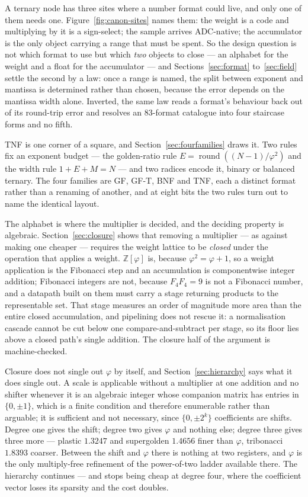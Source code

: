 \documentclass[11pt]{article}
\theoremstyle{definition}
\begin{document}
A ternary node has three sites where a number format could live, and only one of
them needs one. Figure~\ref{fig:canon-sites} names them: the weight is a code and
multiplying by it is a sign-select; the
sample arrives ADC-native; the accumulator is the only object carrying a range
that must be spent. So the design question is not which format to use but which
\emph{two} objects to close --- an alphabet for the weight and a float for the
accumulator --- and Sections~\ref{sec:format} to~\ref{sec:field} settle the
second by a law: once a range is named, the split between exponent and mantissa
is determined rather than chosen, because the error depends on the mantissa
width alone. Inverted, the same law reads a format's behaviour back out of its
round-trip error and resolves an 83-format catalogue into four staircase forms
and no fifth.

TNF is one corner of a square, and Section~\ref{sec:fourfamilies} draws it. Two
rules fix an exponent budget --- the golden-ratio rule
$E=\operatorname{round}((N-1)/\varphi^{2})$ and the width rule $1+E+M=N$ --- and
two radices encode it, binary or balanced ternary. The four families are GF,
GF-T, BNF and TNF, each a distinct format rather than a renaming of another, and
at eight bits the two rules turn out to name the identical layout.

The alphabet is where the multiplier is decided, and the deciding property is
algebraic. Section~\ref{sec:closure} shows that removing a multiplier --- as
against making one cheaper --- requires the weight lattice to be \emph{closed}
under the operation that applies a weight. $\mathbb{Z}[\varphi]$ is, because
$\varphi^2=\varphi+1$, so a weight application is the Fibonacci step and an
accumulation is componentwise integer addition; Fibonacci integers are not,
because $F_4F_4=9$ is not a Fibonacci number, and a datapath built on them must
carry a stage returning products to the representable set. That stage measures
an order of magnitude more area than the entire closed accumulation, and
pipelining does not rescue it: a normalisation cascade cannot be cut below one
compare-and-subtract per stage, so its floor lies above a closed path's single
addition. The closure half of the argument is machine-checked.

Closure does not single out $\varphi$ by itself, and Section~\ref{sec:hierarchy}
says what it does single out. A scale is applicable without a multiplier at one
addition and no shifter whenever it is an algebraic integer whose companion
matrix has entries in $\{0,\pm1\}$, which is a finite condition and therefore
enumerable rather than arguable; it is sufficient and not necessary, since
$\{0,\pm2^k\}$ coefficients are shifts. Degree one gives the shift; degree two
gives $\varphi$ and nothing else; degree three gives three more --- plastic
$1.3247$ and supergolden $1.4656$ finer than $\varphi$, tribonacci $1.8393$
coarser. Between the shift and $\varphi$ there is nothing at two registers, and
$\varphi$ is the only multiply-free refinement of the power-of-two ladder
available there. The hierarchy continues --- and
stops being cheap at degree four, where the coefficient vector loses its
sparsity and the cost doubles.
\end{document}
